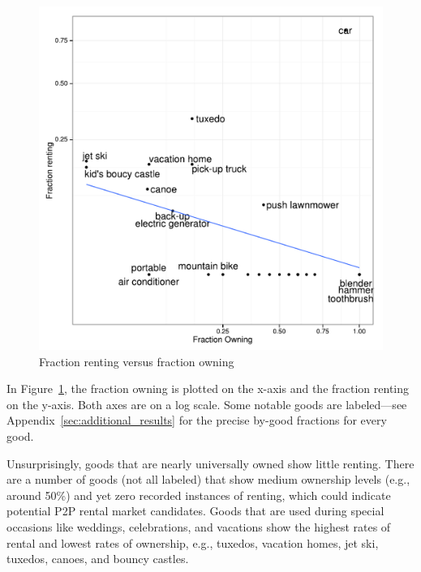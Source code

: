 \documentclass[11pt]{article}
\begin{document}
\begin{figure}
\centering 
\caption{Fraction renting versus fraction owning \label{fig:scatter} }
\begin{minipage}{0.60 \linewidth}
\includegraphics[width = \linewidth]{./plots/scatter_rent_v_own.pdf} 
\end{minipage} 
\end{figure} 

In Figure~\ref{fig:scatter}, the fraction owning is plotted on the x-axis and the fraction renting on the y-axis.
Both axes are on a log scale. 
Some notable goods are labeled---see Appendix~\ref{sec:additional_results} for the precise by-good fractions for every good.

Unsurprisingly, goods that are nearly universally owned show little renting. 
There are a number of goods (not all labeled) that show medium ownership levels (e.g., around 50\%) and yet zero recorded instances of renting, which could indicate potential P2P rental market candidates. 
Goods that are used during special occasions like weddings, celebrations, and vacations show the highest rates of rental and lowest rates of ownership, e.g., tuxedos, vacation homes, jet ski, tuxedos, canoes, and bouncy castles. 


\end{document}
